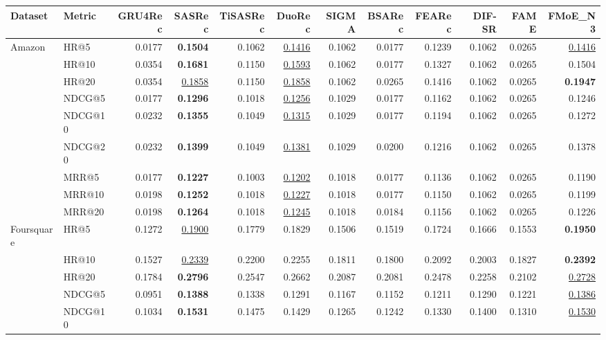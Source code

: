 \begin{tabular}{llrrrrrrrrrr}
\hline
Dataset & Metric & GRU4Rec & SASRec & TiSASRec & DuoRec & SIGMA & BSARec & FEARec & DIF-SR & FAME & FMoE\_N3 \\
\hline
Amazon & HR@5 & 0.0177 & \textbf{0.1504} & 0.1062 & \underline{0.1416} & 0.1062 & 0.0177 & 0.1239 & 0.1062 & 0.0265 & \underline{0.1416} \\
 & HR@10 & 0.0354 & \textbf{0.1681} & 0.1150 & \underline{0.1593} & 0.1062 & 0.0177 & 0.1327 & 0.1062 & 0.0265 & 0.1504 \\
 & HR@20 & 0.0354 & \underline{0.1858} & 0.1150 & \underline{0.1858} & 0.1062 & 0.0265 & 0.1416 & 0.1062 & 0.0265 & \textbf{0.1947} \\
 & NDCG@5 & 0.0177 & \textbf{0.1296} & 0.1018 & \underline{0.1256} & 0.1029 & 0.0177 & 0.1162 & 0.1062 & 0.0265 & 0.1246 \\
 & NDCG@10 & 0.0232 & \textbf{0.1355} & 0.1049 & \underline{0.1315} & 0.1029 & 0.0177 & 0.1194 & 0.1062 & 0.0265 & 0.1272 \\
 & NDCG@20 & 0.0232 & \textbf{0.1399} & 0.1049 & \underline{0.1381} & 0.1029 & 0.0200 & 0.1216 & 0.1062 & 0.0265 & 0.1378 \\
 & MRR@5 & 0.0177 & \textbf{0.1227} & 0.1003 & \underline{0.1202} & 0.1018 & 0.0177 & 0.1136 & 0.1062 & 0.0265 & 0.1190 \\
 & MRR@10 & 0.0198 & \textbf{0.1252} & 0.1018 & \underline{0.1227} & 0.1018 & 0.0177 & 0.1150 & 0.1062 & 0.0265 & 0.1199 \\
 & MRR@20 & 0.0198 & \textbf{0.1264} & 0.1018 & \underline{0.1245} & 0.1018 & 0.0184 & 0.1156 & 0.1062 & 0.0265 & 0.1226 \\
\hline
Foursquare & HR@5 & 0.1272 & \underline{0.1900} & 0.1779 & 0.1829 & 0.1506 & 0.1519 & 0.1724 & 0.1666 & 0.1553 & \textbf{0.1950} \\
 & HR@10 & 0.1527 & \underline{0.2339} & 0.2200 & 0.2255 & 0.1811 & 0.1800 & 0.2092 & 0.2003 & 0.1827 & \textbf{0.2392} \\
 & HR@20 & 0.1784 & \textbf{0.2796} & 0.2547 & 0.2662 & 0.2087 & 0.2081 & 0.2478 & 0.2258 & 0.2102 & \underline{0.2728} \\
 & NDCG@5 & 0.0951 & \textbf{0.1388} & 0.1338 & 0.1291 & 0.1167 & 0.1152 & 0.1211 & 0.1290 & 0.1221 & \underline{0.1386} \\
 & NDCG@10 & 0.1034 & \textbf{0.1531} & 0.1475 & 0.1429 & 0.1265 & 0.1242 & 0.1330 & 0.1400 & 0.1310 & \underline{0.1530} \\

\end{tabular}
